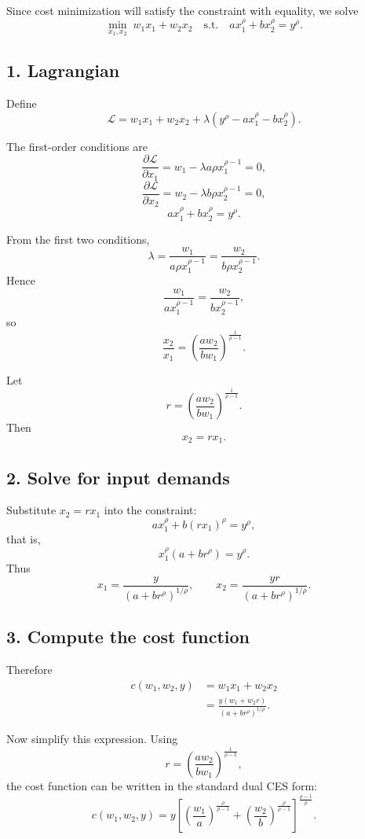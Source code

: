 Since cost minimization will satisfy the constraint with equality, we solve
\[
\min_{x_1,x_2}\; w_1x_1+w_2x_2
\quad \text{s.t.} \quad
a x_1^\rho+b x_2^\rho=y^\rho.
\]

\subsection*{1. Lagrangian}

Define
\[
\mathcal L=w_1x_1+w_2x_2+\lambda\left(y^\rho-a x_1^\rho-b x_2^\rho\right).
\]

The first-order conditions are
\[
\frac{\partial \mathcal L}{\partial x_1}
=
w_1-\lambda a\rho x_1^{\rho-1}=0,
\]
\[
\frac{\partial \mathcal L}{\partial x_2}
=
w_2-\lambda b\rho x_2^{\rho-1}=0,
\]
\[
a x_1^\rho+b x_2^\rho=y^\rho.
\]

From the first two conditions,
\[
\lambda=\frac{w_1}{a\rho x_1^{\rho-1}}
=\frac{w_2}{b\rho x_2^{\rho-1}}.
\]
Hence
\[
\frac{w_1}{a x_1^{\rho-1}}=\frac{w_2}{b x_2^{\rho-1}},
\]
so
\[
\frac{x_2}{x_1}
=
\left(\frac{a w_2}{b w_1}\right)^{\frac{1}{\rho-1}}.
\]

Let
\[
r=\left(\frac{a w_2}{b w_1}\right)^{\frac{1}{\rho-1}}.
\]
Then
\[
x_2=r x_1.
\]

\subsection*{2. Solve for input demands}

Substitute \(x_2=rx_1\) into the constraint:
\[
a x_1^\rho+b(rx_1)^\rho=y^\rho,
\]
that is,
\[
x_1^\rho(a+b r^\rho)=y^\rho.
\]
Thus
\[
x_1=\frac{y}{(a+b r^\rho)^{1/\rho}},
\qquad
x_2=\frac{yr}{(a+b r^\rho)^{1/\rho}}.
\]

\subsection*{3. Compute the cost function}

Therefore
\[
\begin{aligned}
c(w_1,w_2,y)
&=w_1x_1+w_2x_2\\
&=
\frac{y(w_1+w_2 r)}{(a+b r^\rho)^{1/\rho}}.
\end{aligned}
\]

Now simplify this expression. Using
\[
r=\left(\frac{a w_2}{b w_1}\right)^{\frac{1}{\rho-1}},
\]
the cost function can be written in the standard dual CES form:
\[
\boxed{
c(w_1,w_2,y)
=
y
\left[
\left(\frac{w_1}{a}\right)^{\frac{\rho}{\rho-1}}
+
\left(\frac{w_2}{b}\right)^{\frac{\rho}{\rho-1}}
\right]^{\frac{\rho-1}{\rho}}.
}
\]

